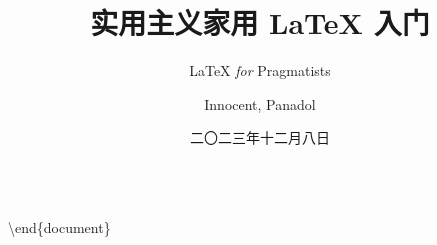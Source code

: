 \documentclass[punct=CCT]{ctexbeamer}
\title{实用主义家用 \LaTeX{} 入门}
\subtitle{\LaTeX{} \textit{for} Pragmatists}
\author{Innocent, Panadol}
\institute{中山大学\quad 笃行工作室 \textit{\&} SPS 物理协会}
\date{二〇二三年十二月八日}
\begin{document}
\maketitle


\begin{frame}
	\begin{columns}[t]
		\begin{column}{.3\textwidth}
			\par\medskip
			\Huge\hfill\hbox{}
		\end{column}
		\begin{column}{.65\textwidth}
			\tableofcontents
		\end{column}
	\end{columns}
\end{frame}











\begin{frame}[standout]
    \Huge\ttfamily\textbackslash end\{document\}
\end{frame}
\end{document}
